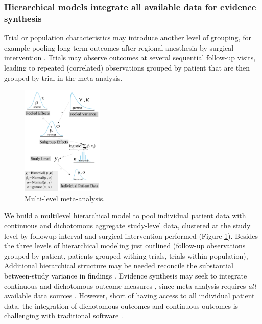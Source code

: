 \documentclass[11pt,notitlepage]{article}
\begin{document}
\subsubsection*{Hierarchical models integrate all available data for evidence synthesis}

Trial or population characteristics may introduce another level of grouping, for example pooling long-term outcomes 
after regional anesthesia by surgical intervention \cite{Andreae2013,Abroug2011}. Trials may observe outcomes at several 
sequential follow-up visits, leading to repeated (correlated) observations grouped by patient that are then grouped by trial 
in the meta-analysis.

\begin{figure} 
 \vspace*{-14pt}
  \includegraphics[width=0.35\textwidth]{Figures/DistrogramMultiLevelMetaAnalysis.pdf} 
 \caption{Multi-level meta-analysis.}
 \vspace{-10pt}
 \label{fig:MetaAnalysis}
 \vspace*{-10pt}
\end{figure}

We build a multilevel hierarchical model to pool individual patient data with continuous and 
dichotomous aggregate study-level data, clustered at the study level by followup interval and surgical 
intervention performed (Figure \ref{fig:MetaAnalysis}). Besides the three levels of hierarchical modeling just outlined 
(follow-up observations grouped by patient, patients grouped withing trials, trials within population), 
Additional hierarchical structure may be needed reconcile the substantial between-study variance in findings \cite{Andreae2015}. 
Evidence synthesis may seek to integrate continuous and dichotomous outcome measures \cite{AndreaeJohnsonAbstract2013}, since
meta-analysis requires \textit{all} available data sources \cite{Deeks2011chapter}. However, short of having access to all individual patient data, 
the integration of dichotomous outcomes and continuous outcomes is challenging with traditional software
\cite{Andreae2015, Roth2015CriticalCare}. 
\end{document}
